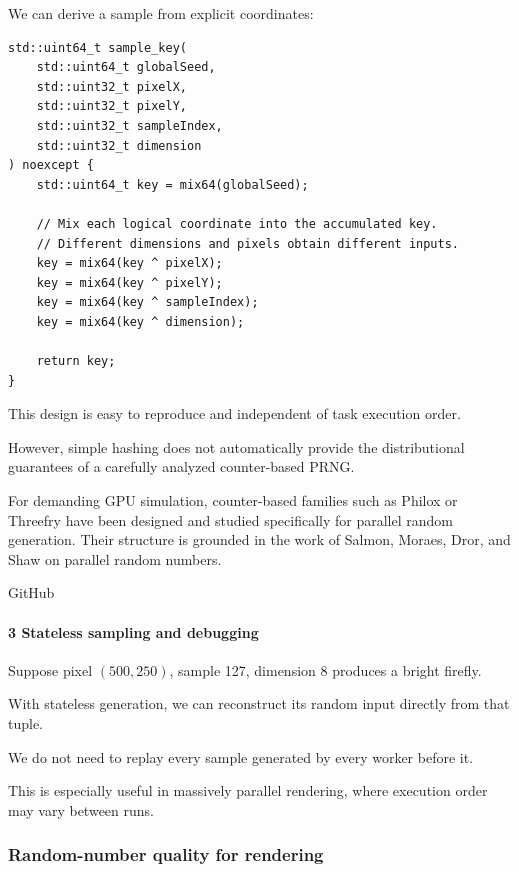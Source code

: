 We can derive a sample from explicit coordinates:

\begin{verbatim}
std::uint64_t sample_key(
    std::uint64_t globalSeed,
    std::uint32_t pixelX,
    std::uint32_t pixelY,
    std::uint32_t sampleIndex,
    std::uint32_t dimension
) noexcept {
    std::uint64_t key = mix64(globalSeed);

    // Mix each logical coordinate into the accumulated key.
    // Different dimensions and pixels obtain different inputs.
    key = mix64(key ^ pixelX);
    key = mix64(key ^ pixelY);
    key = mix64(key ^ sampleIndex);
    key = mix64(key ^ dimension);

    return key;
}
\end{verbatim}

This design is easy to reproduce and independent of task execution order.

However, simple hashing does not automatically provide the distributional guarantees of a carefully analyzed counter-based PRNG.

For demanding GPU simulation, counter-based families such as Philox or Threefry have been designed and studied specifically for parallel random generation. Their structure is grounded in the work of Salmon, Moraes, Dror, and Shaw on parallel random numbers.

GitHub

\paragraph{3 Stateless sampling and debugging}\label{02-foundations-ii-ch029-stateless-sampling-and-debugging}

\hypertarget{02-foundations-ii-ch029-stateless-sampling-and-debugging}{}

Suppose pixel \((500,250)\), sample 127, dimension 8 produces a bright firefly.

With stateless generation, we can reconstruct its random input directly from that tuple.

We do not need to replay every sample generated by every worker before it.

This is especially useful in massively parallel rendering, where execution order may vary between runs.

\subsubsection{Random-number quality for rendering}\label{02-foundations-ii-ch029-random-number-quality-for-rendering}

